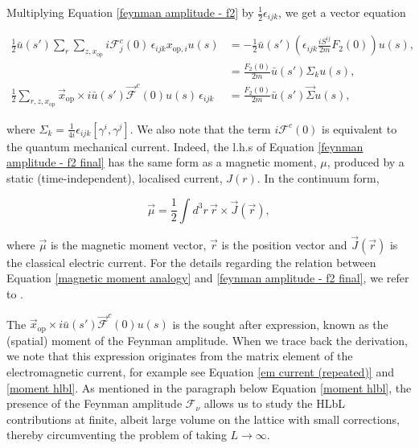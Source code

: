 \documentclass{article}
\numberwithin{equation}{section} %
\begin{document}
Multiplying Equation \ref{feynman amplitude - f2} by $\frac{1}{2}\epsilon_{ijk}$, we get a vector equation

\begin{equation}
\begin{split}
\frac{1}{2} \bar{u}(s')\sum_r\sum_{z,x_\mathrm{op}} i\mathcal{F}^c_j(0) \, \epsilon_{ijk} x_{\mathrm{op},i}u(s) &= -\frac{1}{2}\bar{u}(s')\left( \epsilon_{ijk}\frac{iS^{ij}}{2m}F_2(0)\right)u(s),\\
 &= \frac{F_2(0)}{2m}\bar{u}(s')\Sigma_ku(s),\\
\frac{1}{2} \sum_{r,z,x_\mathrm{op}} \vec{x}_{\mathrm{op}} \times i\bar{u}(s')\vec{\mathcal{F}}^c(0)u(s) \, \epsilon_{ijk}  &= \frac{F_2(0)}{2m}\bar{u}(s')\vec{\Sigma} u(s),
\end{split}
\label{feynman amplitude - f2 final}
\end{equation}

\noindent where $\Sigma_k = \frac{1}{4i}\epsilon_{ijk}[\gamma^i,\gamma^j]$. We also note that the term $i\mathcal{F}^c(0)$ is equivalent to the quantum mechanical current. Indeed, the l.h.s of Equation \ref{feynman amplitude - f2 final} has the same form as a magnetic moment, $\mu$, produced by a static (time-independent), localised current, $J(r)$. In the continuum form, 

\begin{equation}
\vec{\mu} = \frac{1}{2}\int d^3r \, \vec{r} \times \vec{J}(\vec{r}),
\label{magnetic moment analogy}
\end{equation}

\noindent where $\vec{\mu}$ is the magnetic moment vector, $\vec{r}$ is the position vector and $\vec{J}(\vec{r})$ is the classical electric current. For the details regarding the relation between Equation \ref{magnetic moment analogy} and \ref{feynman amplitude - f2 final}, we refer to \cite{blum}.

The $\vec{x}_{\mathrm{op}} \times i\bar{u}(s')\vec{\mathcal{F}}^c(0)u(s)$ is the sought after expression, known as the (spatial) moment of the Feynman amplitude. When we trace back the derivation, we note that this expression originates from the matrix element of the electromagnetic current, for example see Equation \ref{em current (repeated)} and \ref{moment hlbl}. As mentioned in the paragraph below Equation \ref{moment hlbl}, the presence of the Feynman amplitude $\mathcal{F}_\nu$ allows us to study the HLbL contributions at finite, albeit large volume on the lattice with small corrections, thereby circumventing the problem of taking $L\rightarrow \infty$. 
\end{document}
